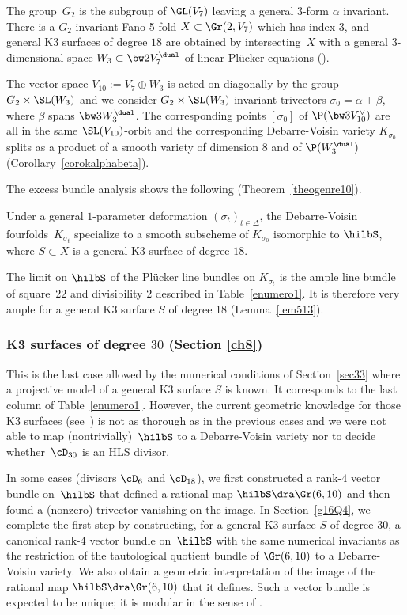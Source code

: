 The group~$G_2$ is the subgroup of $\GL(V_7)$ leaving a general $3$-form $\alpha$ invariant.
There is a $G_2$-invariant Fano 5-fold $X\subset \Gr(2,V_7)$ which has index $3$, and general K3 surfaces of degree $18$ are
obtained by intersecting~$X$ with a general $3$-dimensional space $W_3\subset \bw2V_7^\dual$ of linear Plücker equations (\cite{mukai}).

The vector space $V_{10}:= V_7\oplus W_3$ is acted on diagonally by the group $G_2\times \SL(W_3)$ and {we consider $G_2\times \SL(W_3)$-invariant
trivectors $\sigma_0=\alpha+\beta$, where $\beta$ spans $\bw3W_3^\dual$. The corresponding points $[\sigma_0]$ of $ \P(\bw3V_{10}^\vee)$ are all in the same $\SL(V_{10})$-orbit and the corresponding
Debarre-Voisin variety $K_{\sigma_0}$ splits as a product of a smooth variety of dimension $8$ and of $\P(W_3^\dual)$ (Corollary~\ref{corokalphabeta}).
}

The excess bundle analysis shows the following (Theorem~\ref{theogenre10}).

\begin{theo} \label{theohasgenus10}
Under a general $1$-parameter deformation
$(\sigma_t)_{t\in \Delta}$, the Debarre-Voisin fourfolds~$K_{\sigma_t}$ specialize to a smooth subscheme of $K_{\sigma_0}$ isomorphic
to $\hilbS$, where $S\subset X$ is a general K3 surface of degree $18$.
\end{theo}

The limit on $\hilbS$ of the Plücker line bundles on $K_{\sigma_t}$ is the
ample line bundle of square~$22$ and divisibility $2$
described in Table~\ref{enumero1}.
It is therefore very ample for a general K3 surface $S$ of degree 18 (Lemma~\ref{lem513}).

\subsubsection{K3 surfaces of degree $30$ (Section \ref{ch8})}\label{sec115}
This is the last case allowed by the
numerical conditions of Section~\ref{sec33} where a projective model of a
general K3 surface $S$ is known. It corresponds to the last column of Table~\ref{enumero1}. However, the current geometric knowledge for
those K3 surfaces (see~\cite{mukai2}) is not as thorough as in the previous cases and we were not able to map (nontrivially)~$\hilbS$ to a Debarre-Voisin variety nor to decide whether~$\cD_{30}$ is an HLS divisor.

In some cases (divisors $\cD_6$ and $\cD_{18}$), we first constructed a rank-$4$ vector bundle on~$\hilbS$ that defined a rational map
$\hilbS\dra \Gr(6,10)$ and then found a (nonzero) trivector vanishing on the image. In Section~\ref{g16Q4}, we complete the first step by constructing, for a general K3 surface $S$ of degree $30$, a canonical rank-$4$ vector bundle on~$\hilbS$ with the same
numerical invariants as the restriction of the tautological quotient bundle of
$\Gr(6,10)$ to a Debarre-Voisin variety. We also obtain a geometric
interpretation of the image of the rational map
$\hilbS\dra \Gr(6,10)$ that it defines. Such a vector bundle is expected to be unique; it
is modular in the sense of \cite{ognew}.

